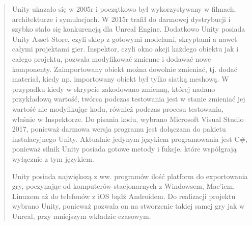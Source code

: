 \begin{quotation}
\indent Unity ukazało się w 2005r i początkowo był wykorzystywany w filmach, architekturze i symulacjach. W 2015r trafił do darmowej dystrybucji i szybko stało się konkurencją dla Unreal Engine. Dodatkowo Unity posiada Unity Asset Store, czyli sklep z gotowymi modelami, skryptami a nawet całymi projektami gier. Inspektor, czyli okno akcji każdego obiektu jak i całego projektu, pozwala modyfikować zmienne i dodawać nowe komponenty. Zaimportowany obiekt można dowolnie zmieniać, tj. dodać materiał, kiedy np. importowany obiekt był tylko siatką meshową. W przypadku kiedy w skrypcie zakodowano zmienną, której nadano przykładową wartość, twórca podczas testowania jest w stanie zmieniać jej wartość nie modyfikując kodu, również podczas procesu testowania, właśnie w Inspektorze. Do pisania kodu, wybrano Microsoft Visual Studio 2017, ponieważ darmowa wersja programu jest dołączana do pakietu instalacyjnego Unity. Aktualnie jedynym językiem programowania jest C\#, ponieważ silnik Unity posiada gotowe metody i fukcje, które współgrają wyłącznie z tym językiem. 

\newpage
Unity posiada największą z ww. programów ilość platform do exportowania gry, poczynając od komputerów stacjonarnych z Windowsem, Mac'iem, Linuxem aż do telefonów z iOS bądź Androidem. Do realizacji projektu wybrano Unity, ponieważ pozwala on na stworzenie takiej samej gry jak w Unreal, przy mniejszym wkładzie czasowym. 

\end{quotation}
